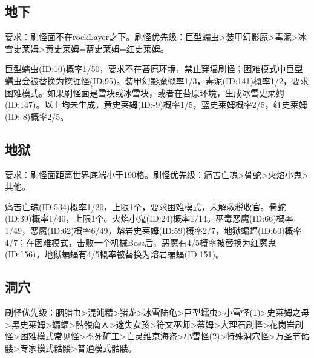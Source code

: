 \subsection{地下}
要求：刷怪面不在rockLayer之下。刷怪优先级：巨型蠕虫>装甲幻影魔>毒泥>冰雪史莱姆>黄史莱姆=蓝史莱姆=红史莱姆。

巨型蠕虫(ID:10)概率1/50，要求不在苔原环境，禁止穿墙刷怪；困难模式中巨型蠕虫会被替换为挖掘怪(ID:95)。装甲幻影魔概率1/3，毒泥(ID:141)概率1/2，要求困难模式。如果刷怪面是雪块或冰雪块，或者在苔原环境，生成冰雪史莱姆(ID:147)。以上均未生成，黄史莱姆(ID:-9)概率1/5，蓝史莱姆概率2/5，红史莱姆(ID:-8)概率2/5。

\subsection{地狱}
要求：刷怪面距离世界底端小于190格。刷怪优先级：痛苦亡魂>骨蛇>火焰小鬼>其他。

痛苦亡魂(ID:534)概率1/20，上限1个，要求困难模式，未解救税收官。骨蛇(ID:39)概率1/40，上限1个。火焰小鬼(ID:24)概率1/14。巫毒恶魔(ID:66)概率1/49，恶魔(ID:62)概率6/49，熔岩史莱姆(ID:59)概率2/7，地狱蝙蝠(ID:60)概率4/7；在困难模式，击败一个机械Boss后，恶魔有4/5概率被替换为红魔鬼(ID:156)，地狱蝙蝠有4/5概率被替换为熔岩蝙蝠(ID:151)。

\subsection{洞穴}
刷怪优先级：胭脂虫>混沌精>猪龙>冰雪陆龟>巨型蠕虫>小雪怪(1)>史莱姆之母>黑史莱姆>蝙蝠>骷髅商人>迷失女孩>符文巫师>蒂姆>大理石刷怪>花岗岩刷怪>困难模式常见怪>不死矿工>亡灵维京海盗>小雪怪(2)>特殊洞穴怪>万圣节骷髅>专家模式骷髅>普通模式骷髅。


